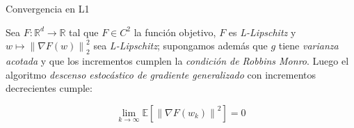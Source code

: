 \documentclass{beamer}
\newcommand{\R}{{\mathbb{R}}}
\newcommand{\N}{{\mathbb{N}}}
\newcommand{\norm}[1]{\left\lVert#1\right\rVert}
\newcommand{\expectation}[1]{\mathbb{E} \left[#1\right]}
\newcommand{\underlimitinf}[1]{\xrightarrow[#1 \rightarrow \infty]{}}
\begin{document}
%	
%	
%
%
%
%

\begin{frame}{Convergencia en L1}
\begin{theorem}
	Sea $F: \R^d \rightarrow \R$ tal que $F \in C^2$ la funci\'on objetivo, $F$ es \textit{L-Lipschitz} y $w \mapsto \norm{\nabla F (w)}_2^2$ sea \textit{L-Lipschitz}; supongamos adem\'as que $g$ tiene \textit{varianza acotada} y que los incrementos cumplen la \textit{condici\'on de Robbins Monro}. Luego el algoritmo \textit{descenso estoc\'astico de gradiente generalizado} con incrementos decrecientes cumple:
	
	\begin{equation*}
	\lim\limits_{k \rightarrow \infty} \expectation{\norm{\nabla F (w_k)}^2} = 0
	\end{equation*}
	
\end{theorem}
\end{frame}
\end{document}
